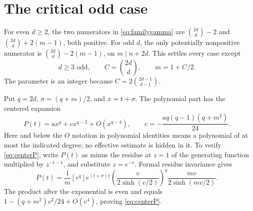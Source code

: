 \documentclass[11pt,reqno]{amsart}
\theoremstyle{remark}
\begin{document}
\section{The critical odd case}\label{sec:critical}

For even \(d\ge2\), the two numerators in \eqref{eq:familygamma} are
\(\binom{2d}{d}-2\) and \(\binom{2d}{d}+2(m-1)\), both positive.
For odd \(d\), the only potentially nonpositive numerator is
\(\binom{2d}{d}-2(m-1)\), on \(m\mid n+2d\).
This settles every case except
\begin{equation}\label{eq:critical}
 d\ge3\text{ odd},\qquad C=\binom{2d}{d},\qquad m=1+C/2.
\end{equation}
The parameter is an integer because \(C=2\binom{2d-1}{d-1}\).

Put \(q=2d\), \(\sigma=(q+m)/2\), and \(x=t+\sigma\). The polynomial part
has the centered expansion
\begin{equation}\label{eq:centerP}
 P(t)=ax^q+cx^{q-2}+O(x^{q-4}),\qquad
 c=-\frac{a q(q-1)(q+m^2)}{24}.
\end{equation}
Here and below the \(O\) notation in polynomial identities means a polynomial
of at most the indicated degree; no effective estimate is hidden in it.
To verify \eqref{eq:centerP}, write \(P(t)\) as minus the residue at \(z=1\)
of the generating function multiplied by \(z^{-t-1}\), and substitute
\(z=e^{-v}\). Formal residue invariance gives
\[
 P(t)=\frac1m[v^q]e^{(t+\sigma)v}
       \left(\frac{v}{2\sinh(v/2)}\right)^q
       \frac{mv}{2\sinh(mv/2)}.
\]
The product after the exponential is even and equals
\(1-(q+m^2)v^2/24+O(v^4)\), proving \eqref{eq:centerP}.
\end{document}
